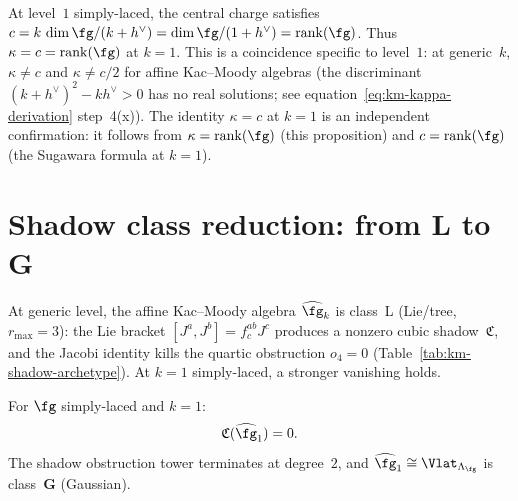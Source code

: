 \begin{remark}%
\label{rem:level1-central-charge}%
At level~$1$ simply-laced, the central charge satisfies
$c = k\,\dim\fg/(k+h^\vee) = \dim\fg/(1+h^\vee) =
\operatorname{rank}(\fg)$. Thus
$\kappa = c = \operatorname{rank}(\fg)$ at $k = 1$.
This is a coincidence specific to level~$1$: at generic~$k$,
$\kappa \neq c$ and $\kappa \neq c/2$ for affine Kac--Moody
algebras (the discriminant $(k+h^\vee)^2 - kh^\vee > 0$
has no real solutions; see equation~\eqref{eq:km-kappa-derivation}
step~4(x)). The identity $\kappa = c$ at $k = 1$ is an
independent confirmation: it follows from
$\kappa = \operatorname{rank}(\fg)$ (this proposition) and
$c = \operatorname{rank}(\fg)$ (the Sugawara formula at
$k = 1$).
\end{remark}



\section{Shadow class reduction: from L to G}%
\label{sec:level1-shadow}

At generic level, the affine Kac--Moody algebra
$\widehat{\fg}_k$ is class~L (Lie/tree, $r_{\max} = 3$):
the Lie bracket $[J^a, J^b] = f^{ab}_c J^c$ produces a
nonzero cubic shadow~$\mathfrak{C}$, and the Jacobi identity
kills the quartic obstruction $o_4 = 0$
(Table~\ref{tab:km-shadow-archetype}). At $k = 1$
simply-laced, a stronger vanishing holds.

\begin{proposition}%
\label{prop:level1-cubic-vanishing}%
%
For $\fg$ simply-laced and $k = 1$:
\begin{equation}\label{eq:level1-cubic-vanishing}
\mathfrak{C}(\widehat{\fg}_1) = 0.
\end{equation}
The shadow obstruction tower terminates at degree~$2$, and
$\widehat{\fg}_1 \cong \Vlat_{\Lambda_\fg}$ is
class~$\mathbf{G}$ \textup{(}Gaussian\textup{)}.
\end{proposition}

